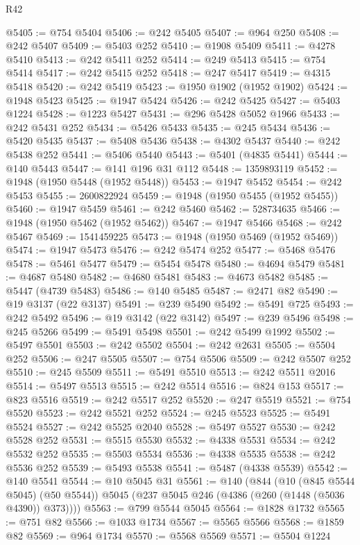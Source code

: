 \begin{lexlean}{R42}
\begin{coremodule}
{@5405 := @754 @5404
@5406 := @242 @5405
@5407 := @964 @250
@5408 := @242 @5407
@5409 := @5403 @252
@5410 := @1908 @5409
@5411 := @4278 @5410
@5413 := @242 @5411 @252
@5414 := @249 @5413
@5415 := @754 @5414
@5417 := @242 @5415 @252
@5418 := @247 @5417
@5419 := @4315 @5418
@5420 := @242 @5419
@5423 := @1950 @1902 (@1952 @1902)
@5424 := @1948 @5423
@5425 := @1947 @5424
@5426 := @242 @5425
@5427 := @5403 @1224
@5428 := @1223 @5427
@5431 := @296 @5428 @5052 @1966
@5433 := @242 @5431 @252
@5434 := @5426 @5433
@5435 := @245 @5434
@5436 := @5420 @5435
@5437 := @5408 @5436
@5438 := @4302 @5437
@5440 := @242 @5438 @252
@5441 := @5406 @5440
@5443 := @5401 (@4835 @5441)
@5444 := @140 @5443
@5447 := @141 @196 @31 @112
@5448 := 1359893119
@5452 := @1948 (@1950 @5448 (@1952 @5448))
@5453 := @1947 @5452
@5454 := @242 @5453
@5455 := 2600822924
@5459 := @1948 (@1950 @5455 (@1952 @5455))
@5460 := @1947 @5459
@5461 := @242 @5460
@5462 := 528734635
@5466 := @1948 (@1950 @5462 (@1952 @5462))
@5467 := @1947 @5466
@5468 := @242 @5467
@5469 := 1541459225
@5473 := @1948 (@1950 @5469 (@1952 @5469))
@5474 := @1947 @5473
@5476 := @242 @5474 @252
@5477 := @5468 @5476
@5478 := @5461 @5477
@5479 := @5454 @5478
@5480 := @4694 @5479
@5481 := @4687 @5480
@5482 := @4680 @5481
@5483 := @4673 @5482
@5485 := @5447 (@4739 @5483)
@5486 := @140 @5485
@5487 := @2471 @82
@5490 := @19 @3137 (@22 @3137)
@5491 := @239 @5490
@5492 := @5491 @725
@5493 := @242 @5492
@5496 := @19 @3142 (@22 @3142)
@5497 := @239 @5496
@5498 := @245 @5266
@5499 := @5491 @5498
@5501 := @242 @5499 @1992
@5502 := @5497 @5501
@5503 := @242 @5502
@5504 := @242 @2631
@5505 := @5504 @252
@5506 := @247 @5505
@5507 := @754 @5506
@5509 := @242 @5507 @252
@5510 := @245 @5509
@5511 := @5491 @5510
@5513 := @242 @5511 @2016
@5514 := @5497 @5513
@5515 := @242 @5514
@5516 := @824 @153
@5517 := @823 @5516
@5519 := @242 @5517 @252
@5520 := @247 @5519
@5521 := @754 @5520
@5523 := @242 @5521 @252
@5524 := @245 @5523
@5525 := @5491 @5524
@5527 := @242 @5525 @2040
@5528 := @5497 @5527
@5530 := @242 @5528 @252
@5531 := @5515 @5530
@5532 := @4338 @5531
@5534 := @242 @5532 @252
@5535 := @5503 @5534
@5536 := @4338 @5535
@5538 := @242 @5536 @252
@5539 := @5493 @5538
@5541 := @5487 (@4338 @5539)
@5542 := @140 @5541
@5544 := @10 @5045 @31
@5561 := @140
    (@844
      (@10 (@845 @5544 @5045) (@50 @5544))
      @5045
      (@237 @5045 @246 (@4386 (@260 (@1448 (@5036 @4390)) @373))))
@5563 := @799 @5544 @5045
@5564 := @1828 @1732
@5565 := @751 @82
@5566 := @1033 @1734
@5567 := @5565 @5566
@5568 := @1859 @82
@5569 := @964 @1734
@5570 := @5568 @5569
@5571 := @5504 @1224
}
\end{coremodule}
\end{lexlean}
